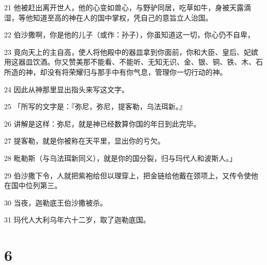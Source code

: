 \par 21 他被赶出离开世人，他的心变如兽心，与野驴同居，吃草如牛，身被天露滴湿，等他知道至高的神在人的国中掌权，凭自己的意旨立人治国。
\par 22 伯沙撒啊，你是他的儿子（或作：孙子），你虽知道这一切，你心仍不自卑，
\par 23 竟向天上的主自高，使人将他殿中的器皿拿到你面前，你和大臣、皇后、妃嫔用这器皿饮酒。你又赞美那不能看、不能听、无知无识、金、银、铜、铁、木、石所造的神，却没有将荣耀归与那手中有你气息，管理你一切行动的神。
\par 24 因此从神那里显出指头来写这文字。
\par 25 「所写的文字是：『弥尼，弥尼，提客勒，乌法珥新。』
\par 26 讲解是这样：弥尼，就是神已经数算你国的年日到此完毕。
\par 27 提客勒，就是你被称在天平里，显出你的亏欠。
\par 28 毗勒斯（与乌法珥新同义），就是你的国分裂，归与玛代人和波斯人。」
\par 29 伯沙撒下令，人就把紫袍给但以理穿上，把金链给他戴在颈项上，又传令使他在国中位列第三。
\par 30 当夜，迦勒底王伯沙撒被杀。
\par 31 玛代人大利乌年六十二岁，取了迦勒底国。

\chapter{6}


